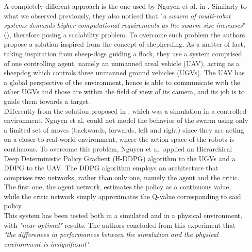 \documentclass[conference]{IEEEtran}
\begin{document}
A completely different approach is the one used by Nguyen et al. in \cite{nguyen2020continuous}. Similarly to what we observed previously, they also noticed that "\textit{a swarm of multi-robot systems demands higher computational requirements as the swarm size increases}"(\cite{nguyen2020continuous}), therefore posing a scalability problem. To overcome such problem the authors propose a solution inspired from the concept of shepherding. As a matter of fact, taking inspiration from sheep-dogs guiding a flock, they use a system comprised of one controlling agent, namely an unmanned areal vehicle (UAV), acting as a sheepdog which controls three unmanned ground vehicles (UGVs). The UAV has a global perspective of the environment, hence is able to communicate with the other UGVs and those are within the field of view of its camera, and its job is to guide them towards a target. \\
Differently from the solution proposed in \cite{guided}, which was a simulation in a controlled environment, Nguyen et al. could not model the behavior of the swarm using only a limited set of moves (backwards, forwards, left and right) since they are acting on a closer-to-real-world environment, where the action space of the robots is continuous.
To overcome this problem,  Nguyen et al. applied an Hierarchical Deep Deterministic Policy Gradient (H-DDPG) algorithm to the UGVs and a DDPG to the UAV.
The DDPG algorithm employs an architecture that comprises two networks, rather than only one, namely the agent and the critic. The first one, the agent network, estimates the policy as a continuous value, while the critic network simply approximates the Q-value corresponding to said policy. \\
This system has been tested both in a simulated and in a physical environment, with \textit{"near-optimal"} results. The authors concluded from this experiment that \textit{"the differences in performances between the simulation and the physical environment is insignificant"}\cite{nguyen2020continuous}. \\
\end{document}
